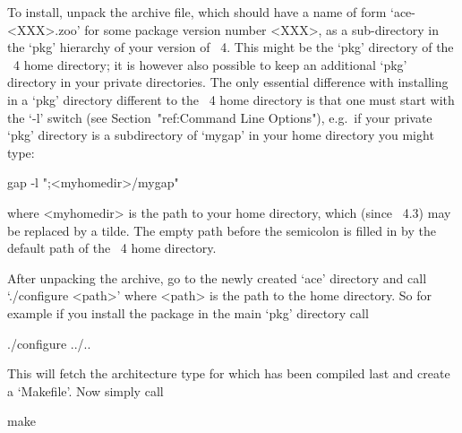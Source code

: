 


To install, unpack the archive file, which should have a name of  form
`ace-<XXX>.zoo'  for  some  package  version  number   <XXX>,   as   a
sub-directory in the `pkg' hierarchy of your version of {\GAP}~4. This
might be the `pkg' directory of the {\GAP}~4  home  directory;  it  is
however also possible to keep an additional `pkg'  directory  in  your
private directories. The only  essential  difference  with  installing
{\ACE} in a `pkg' directory different to the {\GAP}~4  home  directory
is  that  one  must  start  {\GAP}   with   the   `-l'   switch   (see
Section~"ref:Command  Line  Options"),  e.g.~if  your  private   `pkg'
directory is a subdirectory of `mygap'  in  your  home  directory  you
might type:

gap -l ";<myhomedir>/mygap"

where <myhomedir> is the path to your  home  directory,  which  (since
{\GAP}~4.3) may be replaced by a tilde.  The  empty  path  before  the
semicolon is filled in by  the  default  path  of  the  {\GAP}~4  home
directory.

After unpacking the archive, go to the newly created  `ace'  directory
and call `./configure <path>' where <path> is the path to  the  {\GAP}
home directory. So for example if you install the package in the  main
`pkg' directory call

\begintt
./configure ../..
\endtt

This  will fetch  the  architecture  type for  which  {\GAP} has  been
compiled last and create a `Makefile'. Now simply call

\begintt
make
\endtt

